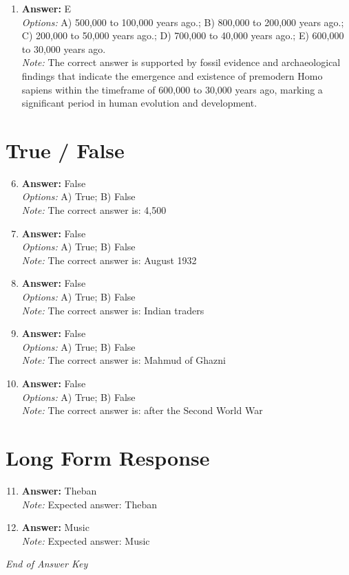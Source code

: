 \documentclass[12pt]{article}
\begin{document}
\begin{enumerate}[label=\arabic*.]
\\ \textit{Note:} Aurignacian technology is characterized by the production of long, thin blades that provide a greater usable surface area for tools compared to the thicker flakes typical of Mousterian technology, thereby enhancing efficiency in tool-making and usage.
\item \textbf{Answer:} E
\\ \textit{Options:} A) 500,000 to 100,000 years ago.; B) 800,000 to 200,000 years ago.; C) 200,000 to 50,000 years ago.; D) 700,000 to 40,000 years ago.; E) 600,000 to 30,000 years ago.
\\ \textit{Note:} The correct answer is supported by fossil evidence and archaeological findings that indicate the emergence and existence of premodern Homo sapiens within the timeframe of 600,000 to 30,000 years ago, marking a significant period in human evolution and development.
\end{enumerate}

\section*{True / False}
\begin{enumerate}[label=\arabic*.]
\setcounter{enumi}{5}
\item \textbf{Answer:} False
\\ \textit{Options:} A) True; B) False
\\ \textit{Note:} The correct answer is: 4,500
\item \textbf{Answer:} False
\\ \textit{Options:} A) True; B) False
\\ \textit{Note:} The correct answer is: August 1932
\item \textbf{Answer:} False
\\ \textit{Options:} A) True; B) False
\\ \textit{Note:} The correct answer is: Indian traders
\item \textbf{Answer:} False
\\ \textit{Options:} A) True; B) False
\\ \textit{Note:} The correct answer is: Mahmud of Ghazni
\item \textbf{Answer:} False
\\ \textit{Options:} A) True; B) False
\\ \textit{Note:} The correct answer is: after the Second World War
\end{enumerate}

\section*{Long Form Response}
\begin{enumerate}[label=\arabic*.]
\setcounter{enumi}{10}
\item \textbf{Answer:} Theban
\\ \textit{Note:} Expected answer: Theban
\item \textbf{Answer:} Music
\\ \textit{Note:} Expected answer: Music
\end{enumerate}

\vfill
\noindent\textit{End of Answer Key}
\end{document}
